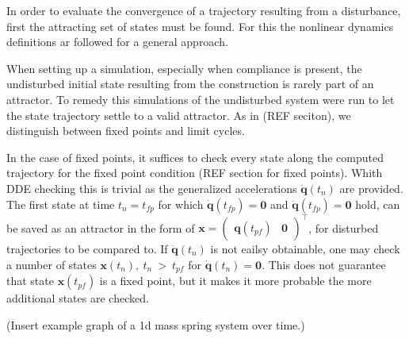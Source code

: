 In order to evaluate the convergence of a trajectory resulting from a disturbance, first the attracting set of states must be found. For this the nonlinear dynamics definitions ar followed for a general approach.


When setting up a simulation, especially when compliance is present, the undisturbed initial state resulting from the construction is rarely part of an attractor. To remedy this simulations of the undisturbed system were run to let the state trajectory settle to a valid attractor. As in (REF seciton), we distinguish between fixed points and limit cycles. 

In the case of fixed points, it suffices to check every state along the computed trajectory for the fixed point condition (REF section for fixed points). Whith DDE checking this is trivial as the generalized accelerations $\ddot{\mathbf{q}}(t_n)$ are provided. 
The first state at time $t_n = t_{fp}$ for which $\dot{\mathbf{q}}(t_{fp}) = \mathbf{0}$ and $\ddot{\mathbf{q}}(t_{fp}) = \mathbf{0}$ hold, can be saved as an attractor in the form of $\mathbf{x} = \begin{pmatrix}\mathbf{q}(t_{pf})&\mathbf{0}\end{pmatrix}^\intercal$, for disturbed trajectories to be compared to. 
If $\ddot{\mathbf{q}}(t_n)$ is not eailsy obtainable, one may check a number of states $\mathbf{x}(t_n),\ t_n\ >\ t_{pf}$ for $\dot{\mathbf{q}}(t_n) = \mathbf{0}$. This does not guarantee that state $\mathbf{x}(t_{pf})$ is a fixed point, 
but it makes it more probable the more additional states are checked. 

(Insert example graph of a 1d mass spring system over time.) 

